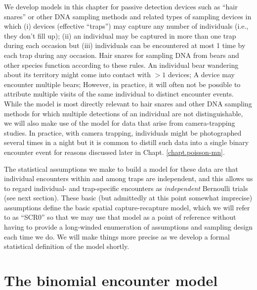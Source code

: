 We develop models in this chapter for passive detection 
devices such as ``hair snares''
or other DNA sampling methods \citep{kery_etal:2010,
  gardner_etal:2010jwm} and related types of sampling devices in which
(i) devices (effective ``traps'') may capture any number of individuals (i.e.,
they don't fill up); 
%
%
(ii) an individual may be
captured in more than one trap during each occasion but (iii) 
individuals can be encountered at most 1 time by each trap during any
occasion.  Hair snares for sampling DNA from bears and other species
function according to these rules. An individual bear wandering about
its territory might come into contact with  $>1$ devices; A device may
encounter multiple bears; However, in practice, it will often not be 
possible to attribute multiple visits of the same individual to
distinct encounter events.
While the model is most directly relevant
to hair snares and other DNA sampling methods for which multiple
detections of an individual are not distinguishable,
we will also make use of the model for data that arise from
camera-trapping studies. In practice, with camera trapping,
individuals might be photographed several times in a night but it is
common to 
 distill such data into a single binary encounter event for
reasons discussed later in Chapt. \ref{chapt.poisson-mn}.

The statistical assumptions we make to build a model for these data 
are that individual encounters
within and among traps are independent, and this allows us to regard
individual- and trap-specific encounters as {\it independent} Bernoulli trials
(see next section).  These basic (but admittedly at this point
somewhat imprecise) assumptions define the basic spatial
capture-recapture model, which we will refer to as ``SCR0'' 
so that we may use that model as a point of reference without having
to provide a long-winded enumeration of assumptions and sampling
design each time we do. We will make things more precise as we develop
a formal statistical definition of the model shortly.


\section{The binomial encounter model}

